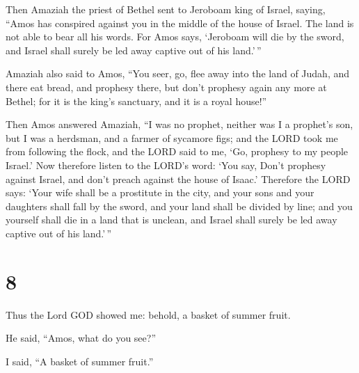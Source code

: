  Then Amaziah the priest of Bethel sent to Jeroboam king
of Israel, saying, ``Amos has conspired against you in the middle of the
house of Israel. The land is not able to bear all his words.
 For Amos says, `Jeroboam will die by the sword, and
Israel shall surely be led away captive out of his land.'\,''

 Amaziah also said to Amos, ``You seer, go, flee away
into the land of Judah, and there eat bread, and prophesy there,
 but don't prophesy again any more at Bethel; for it is
the king's sanctuary, and it is a royal house!''

 Then Amos answered Amaziah, ``I was no prophet, neither
was I a prophet's son, but I was a herdsman, and a farmer of sycamore
figs;  and the LORD took me from following the flock, and
the LORD said to me, `Go, prophesy to my people Israel.' 
Now therefore listen to the LORD's word: `You say, Don't prophesy
against Israel, and don't preach against the house of Isaac.'
 Therefore the LORD says: `Your wife shall be a
prostitute in the city, and your sons and your daughters shall fall by
the sword, and your land shall be divided by line; and you yourself
shall die in a land that is unclean, and Israel shall surely be led away
captive out of his land.'\,''

\hypertarget{section-7}{%
\section{8}\label{section-7}}

 Thus the Lord GOD showed me: behold, a basket of summer
fruit.

 He said, ``Amos, what do you see?''

I said, ``A basket of summer fruit.''

